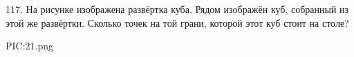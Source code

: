117. На рисунке изображена развёртка куба. Рядом изображён куб, собранный из этой же развёртки. Сколько точек на той грани, которой этот куб стоит на столе?
\begin{center}
{{PIC:21.png}}
\end{center}
